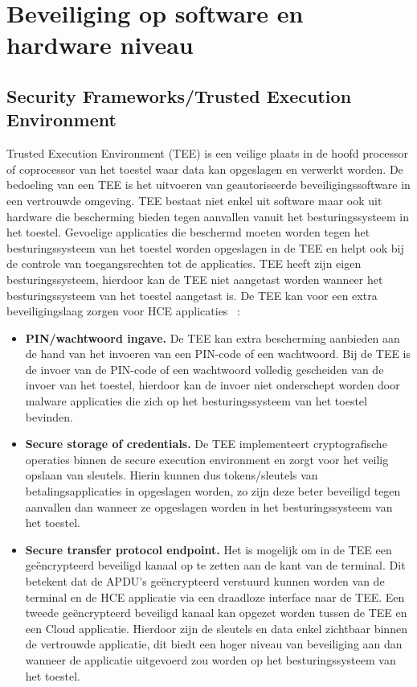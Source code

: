\section{Beveiliging op software en hardware niveau}

\subsection{Security Frameworks/Trusted Execution Environment}
\label{subsec:TEE}
Trusted Execution Environment (TEE) is een veilige plaats in de hoofd processor of coprocessor van het toestel waar data kan opgeslagen en verwerkt worden. De bedoeling van een TEE is het uitvoeren van geautoriseerde beveiligingssoftware in een vertrouwde omgeving. TEE bestaat niet enkel uit software maar ook uit hardware die bescherming bieden tegen aanvallen vanuit het besturingssysteem in het toestel. Gevoelige applicaties die beschermd moeten worden tegen het besturingssysteem van het toestel worden opgeslagen in de TEE en helpt ook bij de controle van toegangsrechten tot de applicaties. TEE heeft zijn eigen besturingssysteem, hierdoor kan de TEE niet aangetast worden wanneer het besturingssysteem van het toestel aangetast is. De TEE kan voor een extra beveiligingslaag zorgen voor HCE applicaties ~\autocite{SCA2014}:

\begin{itemize}
	\item \textbf{PIN/wachtwoord ingave.} De TEE kan extra bescherming aanbieden aan de hand van het invoeren van een PIN-code of een wachtwoord. Bij de TEE is de invoer van de PIN-code of een wachtwoord volledig gescheiden van de invoer van het toestel, hierdoor kan de invoer niet onderschept worden door malware applicaties die zich op het besturingssysteem van het toestel bevinden.
	
	\item \textbf{Secure storage of credentials.} De TEE implementeert cryptografische operaties binnen de secure execution environment en zorgt voor het veilig opslaan van sleutels. Hierin kunnen dus tokens/sleutels van betalingsapplicaties in opgeslagen worden, zo zijn deze beter beveiligd tegen aanvallen dan wanneer ze opgeslagen worden in het besturingssysteem van het toestel.
	
	\item \textbf{Secure transfer protocol endpoint.} Het is mogelijk om in de TEE een geëncrypteerd beveiligd kanaal op te zetten aan de kant van de terminal. Dit betekent dat de APDU's geëncrypteerd verstuurd kunnen worden van de terminal en de HCE applicatie via een draadloze interface naar de TEE. Een tweede geëncrypteerd beveiligd kanaal kan opgezet worden tussen de TEE en een Cloud applicatie. Hierdoor zijn de sleutels en data enkel zichtbaar binnen de vertrouwde applicatie, dit biedt een hoger niveau van beveiliging aan dan wanneer de applicatie uitgevoerd zou worden op het besturingssysteem van het toestel.
\end{itemize}



